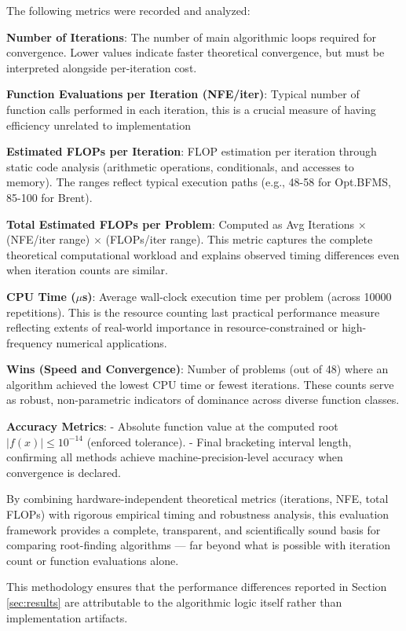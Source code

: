 \documentclass[amsmath, amssymb, aps]{revtex4-2}
\begin{document}
The following metrics were recorded and analyzed:

\textbf{Number of Iterations}: The number of main algorithmic loops required for convergence. Lower values indicate faster theoretical convergence, but must be interpreted alongside per-iteration cost.

\textbf{Function Evaluations per Iteration (NFE/iter)}: Typical number of function calls performed in each iteration, this is a crucial measure of having efficiency unrelated to implementation

\textbf{Estimated FLOPs per Iteration}: FLOP estimation per iteration through static code analysis (arithmetic operations, conditionals, and accesses to memory). The ranges reflect typical execution paths (e.g., 48-58 for Opt.BFMS, 85-100 for Brent).

\textbf{Total Estimated FLOPs per Problem}: Computed as Avg Iterations $\times$ (NFE/iter range) $\times$ (FLOPs/iter range). This metric captures the complete theoretical computational workload and explains observed timing differences even when iteration counts are similar.

\textbf{CPU Time ($\mu$s)}: Average wall-clock execution time per problem (across 10000 repetitions). This is the resource counting last practical performance measure reflecting extents of real-world importance in resource-constrained or high-frequency numerical applications.

\textbf{Wins (Speed and Convergence)}: Number of problems (out of 48) where an algorithm achieved the lowest CPU time or fewest iterations. These counts serve as robust, non-parametric indicators of dominance across diverse function classes.

\textbf{Accuracy Metrics}: 
- Absolute function value at the computed root $|f(x)| \leq 10^{-14}$ (enforced tolerance).
- Final bracketing interval length, confirming all methods achieve machine-precision-level accuracy when convergence is declared.

By combining hardware-independent theoretical metrics (iterations, NFE, total FLOPs) with rigorous empirical timing and robustness analysis, this evaluation framework provides a complete, transparent, and scientifically sound basis for comparing root-finding algorithms — far beyond what is possible with iteration count or function evaluations alone.

This methodology ensures that the performance differences reported in Section \ref{sec:results} are attributable to the algorithmic logic itself rather than implementation artifacts.
\end{document}
